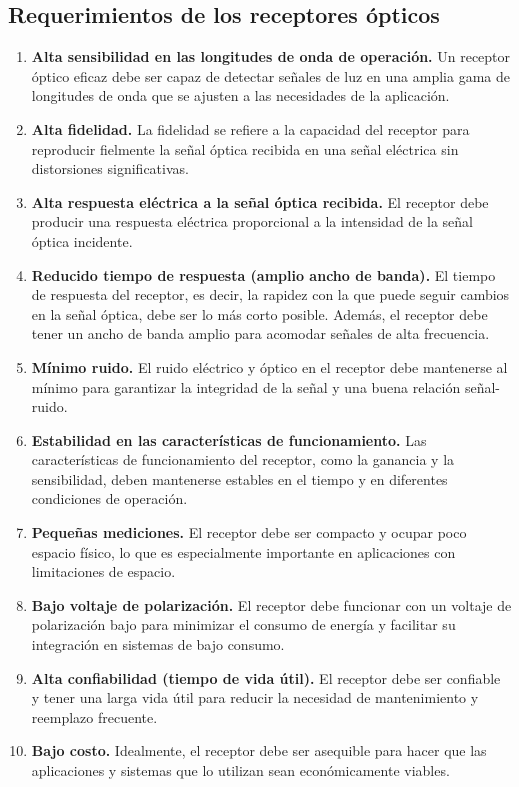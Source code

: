 \documentclass[
	12pt, %
	fleqn, %
	a4paper, %
	oneside, %
]{LegrandOrangeBook}
\begin{document}
\subsection{Requerimientos de los receptores ópticos}
\begin{enumerate}
\item \textbf{Alta sensibilidad en las longitudes de onda de operación.} Un receptor óptico eficaz debe ser capaz de detectar señales de luz en una amplia gama de longitudes de onda que se ajusten a las necesidades de la aplicación.

  \item \textbf{Alta fidelidad.} La fidelidad se refiere a la capacidad del receptor para reproducir fielmente la señal óptica recibida en una señal eléctrica sin distorsiones significativas.

  \item \textbf{Alta respuesta eléctrica a la señal óptica recibida.} El receptor debe producir una respuesta eléctrica proporcional a la intensidad de la señal óptica incidente.

  \item \textbf{Reducido tiempo de respuesta (amplio ancho de banda).} El tiempo de respuesta del receptor, es decir, la rapidez con la que puede seguir cambios en la señal óptica, debe ser lo más corto posible. Además, el receptor debe tener un ancho de banda amplio para acomodar señales de alta frecuencia.

  \item \textbf{Mínimo ruido.} El ruido eléctrico y óptico en el receptor debe mantenerse al mínimo para garantizar la integridad de la señal y una buena relación señal-ruido.

  \item \textbf{Estabilidad en las características de funcionamiento.} Las características de funcionamiento del receptor, como la ganancia y la sensibilidad, deben mantenerse estables en el tiempo y en diferentes condiciones de operación.

  \item \textbf{Pequeñas mediciones.} El receptor debe ser compacto y ocupar poco espacio físico, lo que es especialmente importante en aplicaciones con limitaciones de espacio.

  \item \textbf{Bajo voltaje de polarización.} El receptor debe funcionar con un voltaje de polarización bajo para minimizar el consumo de energía y facilitar su integración en sistemas de bajo consumo.

  \item \textbf{Alta confiabilidad (tiempo de vida útil).} El receptor debe ser confiable y tener una larga vida útil para reducir la necesidad de mantenimiento y reemplazo frecuente.

  \item \textbf{Bajo costo.} Idealmente, el receptor debe ser asequible para hacer que las aplicaciones y sistemas que lo utilizan sean económicamente viables.
\end{enumerate}
\end{document}
